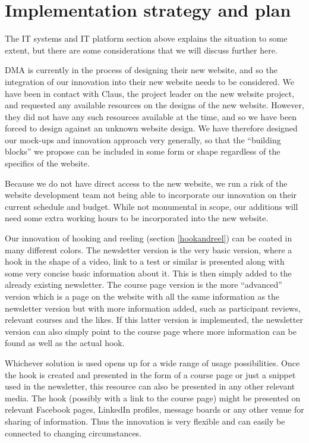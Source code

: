 \section{Implementation strategy and plan}
The IT systems and IT platform section above explains the situation to some extent, but there are some considerations that we will discuss further here.

DMA is currently in the process of designing their new website, and so the integration of our innovation into their new website needs to be considered. We have been in contact with Claus, the project leader on the new website project, and requested any available resources on the designs of the new website. However, they did not have any such resources available at the time, and so we have been forced to design against an unknown website design. We have therefore designed our mock-ups and innovation approach very generally, so that the “building blocks” we propose can be included in some form or shape regardless of the specifics of the website.

Because we do not have direct access to the new website, we run a risk of the website development team not being able to incorporate our innovation on their current schedule and budget. While not monumental in scope, our additions will need some extra working hours to be incorporated into the new website.

Our innovation of hooking and reeling (section \ref{hookandreel}) can be coated in many different colors. The newsletter version is the very basic version, where a hook in the shape of a video, link to a test or similar is presented along with some very concise basic information about it. This is then simply added to the already existing newsletter. The course page version is the more “advanced” version which is a page on the website with all the same information as the newsletter version but with more information added, such as participant reviews, relevant courses and the likes. If this latter version is implemented, the newsletter version can also simply point to the course page where more information can be found as well as the actual hook.

Whichever solution is used opens up for a wide range of usage possibilities. Once the hook is created and presented in the form of a course page or just a snippet used in the newsletter, this resource can also be presented in any other relevant media. The hook (possibly with a link to the course page) might be presented on relevant Facebook pages, LinkedIn profiles, message boards or any other venue for sharing of information. Thus the innovation is very flexible and can easily be connected to changing circumstances.

